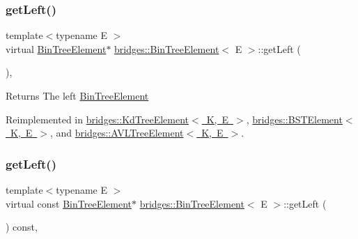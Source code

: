 \subsubsection{\texorpdfstring{get\+Left()}{getLeft()}\hspace{0.1cm}{\footnotesize\ttfamily [1/2]}}
{\footnotesize\ttfamily template$<$typename E $>$ \\
virtual \mbox{\hyperlink{classbridges_1_1_bin_tree_element}{Bin\+Tree\+Element}}$\ast$ \mbox{\hyperlink{classbridges_1_1_bin_tree_element}{bridges\+::\+Bin\+Tree\+Element}}$<$ E $>$\+::get\+Left (\begin{DoxyParamCaption}{ }\end{DoxyParamCaption})\hspace{0.3cm}{\ttfamily [inline]}, {\ttfamily [virtual]}}

\begin{DoxyReturn}{Returns}
The left \mbox{\hyperlink{classbridges_1_1_bin_tree_element}{Bin\+Tree\+Element}} 
\end{DoxyReturn}


Reimplemented in \mbox{\hyperlink{classbridges_1_1_kd_tree_element_ad7db63a4f82f5252c7e0809ac6486cb4}{bridges\+::\+Kd\+Tree\+Element$<$ K, E $>$}}, \mbox{\hyperlink{classbridges_1_1_b_s_t_element_a4d8987373c75b51fca94e3c0b78b87a6}{bridges\+::\+B\+S\+T\+Element$<$ K, E $>$}}, and \mbox{\hyperlink{classbridges_1_1_a_v_l_tree_element_a7b5d05660da127f5f6164120d9846d90}{bridges\+::\+A\+V\+L\+Tree\+Element$<$ K, E $>$}}.

\mbox{\label{classbridges_1_1_bin_tree_element_a0841701bd7d4b444dafbbdfefed067a5}} 
\subsubsection{\texorpdfstring{get\+Left()}{getLeft()}\hspace{0.1cm}{\footnotesize\ttfamily [2/2]}}
{\footnotesize\ttfamily template$<$typename E $>$ \\
virtual const \mbox{\hyperlink{classbridges_1_1_bin_tree_element}{Bin\+Tree\+Element}}$\ast$ \mbox{\hyperlink{classbridges_1_1_bin_tree_element}{bridges\+::\+Bin\+Tree\+Element}}$<$ E $>$\+::get\+Left (\begin{DoxyParamCaption}{ }\end{DoxyParamCaption}) const\hspace{0.3cm}{\ttfamily [inline]}, {\ttfamily [virtual]}}

